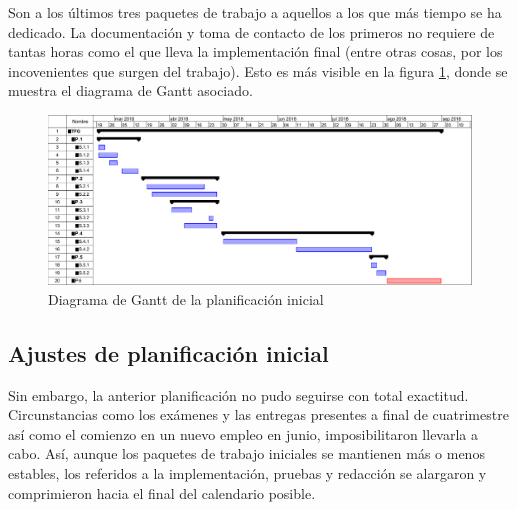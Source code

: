 Son a los últimos tres paquetes de trabajo a aquellos a los que más tiempo se ha dedicado. La documentación y toma de contacto de los primeros no requiere de tantas horas como el que lleva la implementación final (entre otras cosas, por los incovenientes que surgen del trabajo). Esto es más visible en la figura \ref{fig:gant1}, donde se muestra el diagrama de Gantt asociado.

\begin{figure}[H]
  \centering
  \includegraphics[scale=0.45]{imagenes/gant1}
  \caption{Diagrama de Gantt de la planificación inicial}
  \label{fig:gant1}
\end{figure}

\subsection{Ajustes de planificación inicial}
Sin embargo, la anterior planificación no pudo seguirse con total exactitud. Circunstancias como los exámenes y las entregas presentes a final de cuatrimestre así como el comienzo en un nuevo empleo en junio, imposibilitaron llevarla a cabo. Así, aunque los paquetes de trabajo iniciales se mantienen más o menos estables, los referidos a la implementación, pruebas y redacción se alargaron y comprimieron hacia el final del calendario posible.

